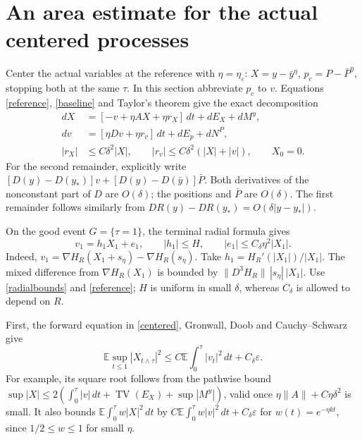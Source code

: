 \documentclass[11pt,a4paper]{article}
\newcommand{\E}{\mathbb E}
\newcommand{\TV}{\operatorname{TV}}
\newcommand{\dt}{\,dt}
\begin{document}
\section{An area estimate for the actual centered processes}
Center the actual variables at the reference with $\eta=\eta_\varepsilon$:
$X=y-\bar y^\eta$, $p_c=P-\bar P^\eta$, stopping both at the same
$\tau$. In this section abbreviate $p_c$ to $v$.
Equations \eqref{reference}, \eqref{baseline} and Taylor's theorem
give the exact decomposition
\begin{equation}\label{centered}
 \begin{split}
 dX&=[-v+\eta AX+\eta r_X]\dt+dE_X+dM^y,\\
 dv&=[\eta Dv+\eta r_v]\dt+dE_p+dN^P,\\
 |r_X|&\leq C\delta^2|X|,\qquad
 |r_v|\leq C\delta^2(|X|+|v|),\qquad X_0=0.
 \end{split}
\end{equation}
For the second remainder, explicitly write
$[D(y)-D(y_*)]v+[D(y)-D(\bar y)]\bar P$.
Both derivatives of the nonconstant part of $D$ are $O(\delta)$;
the positions and $\bar P$ are $O(\delta)$.
The first remainder follows similarly from
$DR(y)-DR(y_*)=O(\delta|y-y_*|)$.

On the good event $G=\{\tau=1\}$, the terminal radial formula gives
\begin{equation}\label{terminal}
 v_1=h_1X_1+e_1,\qquad |h_1|\leq H,\qquad
 |e_1|\leq C_\delta\eta^2|X_1|.
\end{equation}
Indeed, $v_1=\nabla H_R(X_1+s_\eta)-\nabla H_R(s_\eta)$.
Take $h_1=H_R'(|X_1|)/|X_1|$. The mixed difference from
$\nabla H_R(X_1)$ is bounded by
$\|D^3H_R\|\,|s_\eta|\,|X_1|$.
Use \eqref{radialbounds} and \eqref{reference}; $H$ is uniform in
small $\delta$, whereas $C_\delta$ is allowed to depend on $R$.

First, the forward equation in \eqref{centered}, Gronwall, Doob and
Cauchy--Schwarz give
\begin{equation}\label{Poincare}
 \E\sup_{t\leq1}|X_{t\wedge\tau}|^2
       \leq C\E\int_0^\tau|v_t|^2\dt+C_\delta\varepsilon.
\end{equation}
For example, its square root follows from the pathwise bound
$\sup|X|\leq2(\int_0^\tau|v|\dt+\TV(E_X)+\sup|M^y|)$,
valid once $\eta\|A\|+C\eta\delta^2$ is small.
It also bounds $\E\int_0^\tau w|X|^2\dt$ by
$C\E\int_0^\tau w|v|^2\dt+C_\delta\varepsilon$ for
$w(t)=e^{-\eta kt}$, since $1/2\leq w\leq1$ for small $\eta$.
\end{document}

